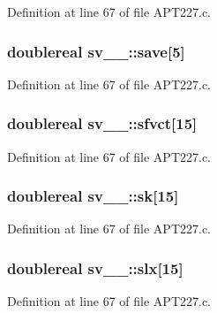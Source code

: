 Definition at line 67 of file A\+P\+T227.\+c.

\subsubsection[{\texorpdfstring{save}{save}}]{\setlength{\rightskip}{0pt plus 5cm}doublereal sv\+\_\+\_\+\+::save\mbox{[}5\mbox{]}}\hypertarget{structsv__1___a66cf511363f6a8ece1800160d76a4216}{}\label{structsv__1___a66cf511363f6a8ece1800160d76a4216}


Definition at line 67 of file A\+P\+T227.\+c.

\subsubsection[{\texorpdfstring{sfvct}{sfvct}}]{\setlength{\rightskip}{0pt plus 5cm}doublereal sv\+\_\+\_\+\+::sfvct\mbox{[}15\mbox{]}}\hypertarget{structsv__1___a0150b65e0d64c17cb84a00da84f87333}{}\label{structsv__1___a0150b65e0d64c17cb84a00da84f87333}


Definition at line 67 of file A\+P\+T227.\+c.

\subsubsection[{\texorpdfstring{sk}{sk}}]{\setlength{\rightskip}{0pt plus 5cm}doublereal sv\+\_\+\_\+\+::sk\mbox{[}15\mbox{]}}\hypertarget{structsv__1___ac29dbbdc6cf661f702ef05c8bb062eaf}{}\label{structsv__1___ac29dbbdc6cf661f702ef05c8bb062eaf}


Definition at line 67 of file A\+P\+T227.\+c.

\subsubsection[{\texorpdfstring{slx}{slx}}]{\setlength{\rightskip}{0pt plus 5cm}doublereal sv\+\_\+\_\+\+::slx\mbox{[}15\mbox{]}}\hypertarget{structsv__1___a8d3f7cabbd595fba649ffab3828bd5f4}{}\label{structsv__1___a8d3f7cabbd595fba649ffab3828bd5f4}


Definition at line 67 of file A\+P\+T227.\+c.

